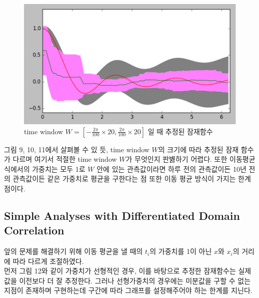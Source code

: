 \documentclass[a4paper]{oblivoir}
\begin{document}
\begin{figure}[ht] \centering 
\includegraphics[scale=0.65]{fig12_12.png} 
\caption{time window $W = \left[-\frac{2 \pi}{100} \times20,\frac{2 \pi}{100} \times20\right]$ 일 때 추정된 잠재함수}
\label{fig:12-11}
\end{figure}

그림 9, 10, 11에서 살펴볼 수 있 듯, time window $W$의 크기에 따라 추정된 잠재 함수가 다르며 여기서 적절한 time window $W$가 무엇인지 판볋하기 어렵다. 또한 이동평균식에서의 가중치는 모두 1로 $W$ 안에 있는 관측값이라면 하루 전의 관측값이든 10년 전의 관측값이든 같은 가중치로 평균을 구한다는 점 또한 이동 평균 방식이 가지는 한계점이다.

\subsection{Simple Analyses with Differentiated Domain Correlation}

앞의 문제를 해결하기 위해 이동 평균을 낼 때의 $t_{i}$의 가중치를 1이 아닌 $x$와 $x_i$의 거리에 따라 다르게 조절하였다.\\
먼저 그림 12와 같이 가중치가 선형적인 경우, 이를 바탕으로 추정한 잠재함수는 실제 값을 이전보다 더 잘 추정한다. 그러나 선형가중치의 경우에는 미분값을 구할 수 없는 지점이 존재하며 구현하는데 구간에 따라 그래프를 설정해주어야 하는 한계를 지닌다.
\end{document}
